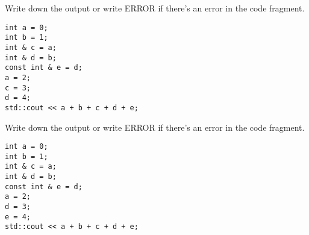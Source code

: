 \nextq
Write down the output or write ERROR if there's an error in the
code fragment.
\begin{Verbatim}[frame=single,fontsize=\footnotesize]
int a = 0;
int b = 1;
int & c = a;
int & d = b;
const int & e = d;
a = 2;
c = 3;
d = 4;
std::cout << a + b + c + d + e;
\end{Verbatim}
\ANSWER
\begin{answercode}

\end{answercode}

\nextq
Write down the output or write ERROR if there's an error in the
code fragment.
\begin{Verbatim}[frame=single,fontsize=\footnotesize]
int a = 0;
int b = 1;
int & c = a;
int & d = b;
const int & e = d;
a = 2;
d = 3;
e = 4;
std::cout << a + b + c + d + e;
\end{Verbatim}
\ANSWER
\begin{answercode}

\end{answercode}

